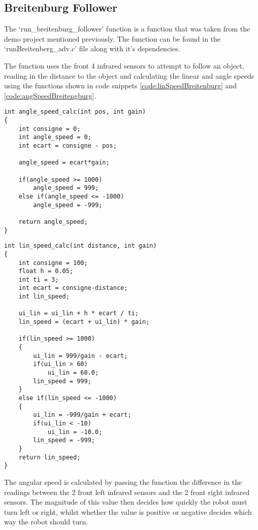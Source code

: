 \subsection{Breitenburg Follower}
The `run\_breitenburg\_follower' function is a function that was taken from the demo project mentioned previously. The function can be found in the `runBreitenberg\_adv.c' file along with it's dependencies.

The function uses the front 4 infrared sensors to attempt to follow an object, reading in the distance to the object and calculating the linear and angle speeds using the functions shown in code snippets \ref{code:linSpeedBreitenburg} and \ref{code:angSpeedBreitengburg}.

\vspace{5mm}
\begin{lstlisting}[caption={Functions for calculating the angular speed of the E-Puck},label=code:angSpeedBreitengburg, float]
int angle_speed_calc(int pos, int gain)
{
	int consigne = 0;
	int angle_speed = 0;
	int ecart = consigne - pos;

	angle_speed = ecart*gain;

	if(angle_speed >= 1000)
		angle_speed = 999;
	else if(angle_speed <= -1000)
		angle_speed = -999;

	return angle_speed;
}
\end{lstlisting}

\begin{lstlisting}[caption={Functions for calculating the linear speed of the E-Puck},label=code:linSpeedBreitenburg, float]
int lin_speed_calc(int distance, int gain)
{
	int consigne = 100;
	float h = 0.05;
	int ti = 3;
	int ecart = consigne-distance;
	int lin_speed;

	ui_lin = ui_lin + h * ecart / ti;
	lin_speed = (ecart + ui_lin) * gain;

	if(lin_speed >= 1000)
	{
		ui_lin = 999/gain - ecart;
		if(ui_lin > 60)	
			ui_lin = 60.0;
		lin_speed = 999;
	}
	else if(lin_speed <= -1000)
	{
		ui_lin = -999/gain + ecart;
		if(ui_lin < -10)
			ui_lin = -10.0;
		lin_speed = -999;
	}
	return lin_speed;
}
\end{lstlisting}

The angular speed is calculated by passing the function the difference in the readings between the 2 front left infrared sensors and the 2 front right infrared sensors. The magnitude of this value then decides how quickly the robot must turn left or right, whilst whether the value is positive or negative decides which way the robot should turn. 

